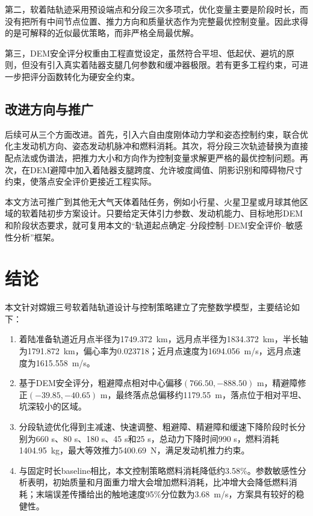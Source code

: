 \documentclass[UTF8,a4paper,12pt]{ctexart}
\begin{document}
第二，软着陆轨迹采用预设端点和分段三次多项式，优化变量主要是阶段时长，而没有把所有中间节点位置、推力方向和质量状态作为完整最优控制变量。因此求得的是可解释的近似最优策略，而非严格全局最优解。

第三，DEM安全评分权重由工程直觉设定，虽然符合平坦、低起伏、避坑的原则，但没有引入真实着陆器支腿几何参数和缓冲器极限。若有更多工程约束，可进一步把评分函数转化为硬安全约束。

\subsection{改进方向与推广}
后续可从三个方面改进。首先，引入六自由度刚体动力学和姿态控制约束，联合优化主发动机方向、姿态发动机脉冲和燃料消耗。其次，将分段三次轨迹替换为直接配点法或伪谱法，把推力大小和方向作为控制变量求解更严格的最优控制问题。再次，在DEM避障中加入着陆器支腿跨度、允许坡度阈值、阴影识别和障碍物尺寸约束，使落点安全评价更接近工程实际。

本文方法可推广到其他无大气天体着陆任务，例如小行星、火星卫星或月球其他区域的软着陆初步方案设计。只要给定天体引力参数、发动机能力、目标地形DEM和阶段状态要求，就可复用本文的``轨道起点确定--分段控制--DEM安全评价--敏感性分析''框架。

\section{结论}
本文针对嫦娥三号软着陆轨道设计与控制策略建立了完整数学模型，主要结论如下：
\begin{enumerate}[label=\arabic*.]
  \item 着陆准备轨道近月点半径为\SI{1749.372}{km}，远月点半径为\SI{1834.372}{km}，半长轴为\SI{1791.872}{km}，偏心率为0.023718；近月点速度为\SI{1694.056}{m/s}，远月点速度为\SI{1615.558}{m/s}。
  \item 基于DEM安全评分，粗避障点相对中心偏移$(766.50,-888.50)$ m，精避障修正$(-39.85,-40.65)$ m，最终落点总偏移约\SI{1179.55}{m}，落点位于相对平坦、坑深较小的区域。
  \item 分段轨迹优化得到主减速、快速调整、粗避障、精避障和缓速下降阶段时长分别为660 s、80 s、180 s、45 s和25 s，总动力下降时间990 s，燃料消耗\SI{1404.95}{kg}，最大等效推力\SI{5400.69}{N}，满足发动机推力约束。
  \item 与固定时长baseline相比，本文控制策略燃料消耗降低约3.58\%。参数敏感性分析表明，初始质量和月面重力增大会增加燃料消耗，比冲增大会降低燃料消耗；末端误差传播给出的触地速度95\%分位数为\SI{3.68}{m/s}，方案具有较好的稳健性。
\end{enumerate}
\end{document}
